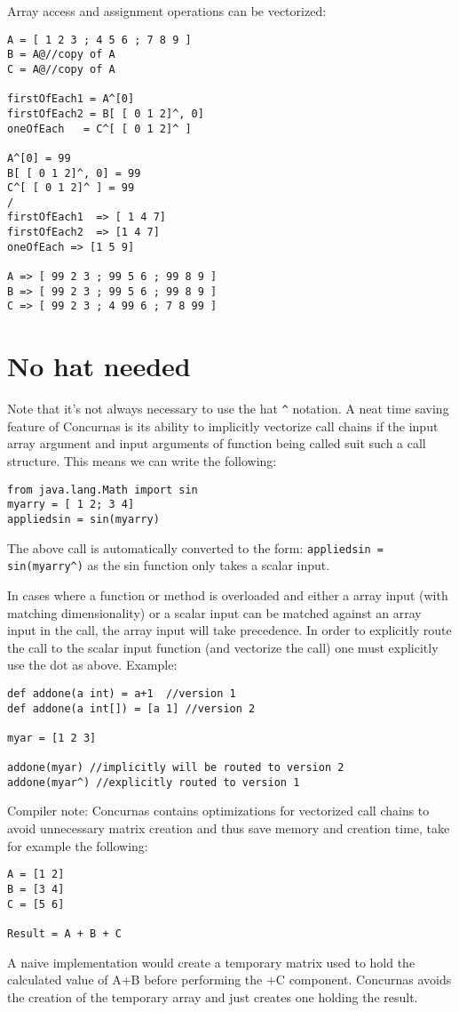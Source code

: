 \documentclass[conc-doc]{subfiles}
\begin{document}
Array access and assignment operations can be vectorized:
\begin{lstlisting}
A = [ 1 2 3 ; 4 5 6 ; 7 8 9 ]
B = A@//copy of A
C = A@//copy of A

firstOfEach1 = A^[0]
firstOfEach2 = B[ [ 0 1 2]^, 0]
oneOfEach   = C^[ [ 0 1 2]^ ]

A^[0] = 99
B[ [ 0 1 2]^, 0] = 99
C^[ [ 0 1 2]^ ] = 99
/
firstOfEach1  => [ 1 4 7]
firstOfEach2  => [1 4 7]
oneOfEach => [1 5 9]

A => [ 99 2 3 ; 99 5 6 ; 99 8 9 ]
B => [ 99 2 3 ; 99 5 6 ; 99 8 9 ]
C => [ 99 2 3 ; 4 99 6 ; 7 8 99 ]
\end{lstlisting}

\section{No hat needed}
Note that it’s not always necessary to use the hat \lstinline{^} notation. A neat time saving feature of Concurnas is its ability to implicitly vectorize call chains if the input array argument and input arguments of function being called suit such a call structure. This means we can write the following:

\begin{lstlisting}
from java.lang.Math import sin
myarry = [ 1 2; 3 4]
appliedsin = sin(myarry)
\end{lstlisting}

The above call is automatically converted to the form: \lstinline{appliedsin = sin(myarry^)} as the sin function only takes a scalar input. 

In cases where a function or method is overloaded and either a array input (with matching dimensionality) or a scalar input can be matched against an array input in the call, the array input will take precedence. In order to explicitly route the call to the scalar input function (and vectorize the call) one must explicitly use the dot as above. Example:
\begin{lstlisting}
def addone(a int) = a+1  //version 1
def addone(a int[]) = [a 1] //version 2

myar = [1 2 3]

addone(myar) //implicitly will be routed to version 2
addone(myar^) //explicitly routed to version 1
\end{lstlisting}

Compiler note: Concurnas contains optimizations for vectorized call chains to avoid unnecessary matrix creation and thus save memory and creation time, take for example the following:

\begin{lstlisting}
A = [1 2]
B = [3 4]
C = [5 6]

Result = A + B + C
\end{lstlisting}

A naive implementation would create a temporary matrix used to hold the calculated value of A+B before performing the +C component. Concurnas avoids the creation of the temporary array and just creates one holding the result.
\end{document}
